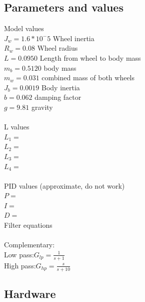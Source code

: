 \documentclass[a4paper]{article}
\begin{document}
\subsection{Parameters and values}
Model values\\
$J_w = 1.6*10^-5$ Wheel inertia \\
$R_w = 0.08$ Wheel radius \\
$L = 0.0950$ Length from wheel to body mass \\
$m_b = 0.5120$ body mass \\
$m_w = 0.031$ combined mass of both wheels \\
$J_b = 0.0019$ Body inertia \\
$b = 0.062$ damping factor \\
$g = 9.81$ gravity \\ \\
L values\\
$L_1=$\\
$L_2=$\\
$L_3=$\\
$L_4=$\\ \\
PID values (approximate, do not work)\\
$P=$\\
$I=$\\
$D=$\\
Filter equations \\ \\
Complementary:$ $ \\
Low pass:$G_{lp} = \frac{1}{s+1}$\\
High pass:$G_{hp} = \frac{s}{s+10}$\\

\subsection{Hardware}
\end{document}
